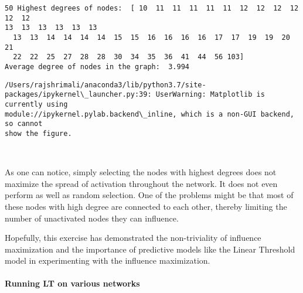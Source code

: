 \documentclass[11pt]{article}
\begin{document}
    \begin{Verbatim}[commandchars=\\\{\}]
50 Highest degrees of nodes:  [ 10  11  11  11  11  11  12  12  12  12  12  12
13  13  13  13  13  13
  13  13  14  14  14  14  15  15  16  16  16  16  17  17  19  19  20  21
  22  22  25  27  28  28  30  34  35  36  41  44  56 103]
Average degree of nodes in the graph:  3.994
    \end{Verbatim}

    \begin{Verbatim}[commandchars=\\\{\}]
/Users/rajshrimali/anaconda3/lib/python3.7/site-
packages/ipykernel\_launcher.py:39: UserWarning: Matplotlib is currently using
module://ipykernel.pylab.backend\_inline, which is a non-GUI backend, so cannot
show the figure.
    \end{Verbatim}

    \begin{center}
    \end{center}
    { \hspace*{\fill} \\}
    
    As one can notice, simply selecting the nodes with highest degrees does
not maximize the spread of activation throughout the network. It does
not even perform as well as random selection. One of the problems might
be that most of these nodes with high degree are connected to each
other, thereby limiting the number of unactivated nodes they can
influence.

Hopefully, this exercise has demonstrated the non-triviality of
influence maximization and the importance of predictive models like the
Linear Threshold model in experimenting with the influence maximization.

    \hypertarget{running-lt-on-various-networks}{%
\paragraph{Running LT on various
networks}\label{running-lt-on-various-networks}}
\end{document}
